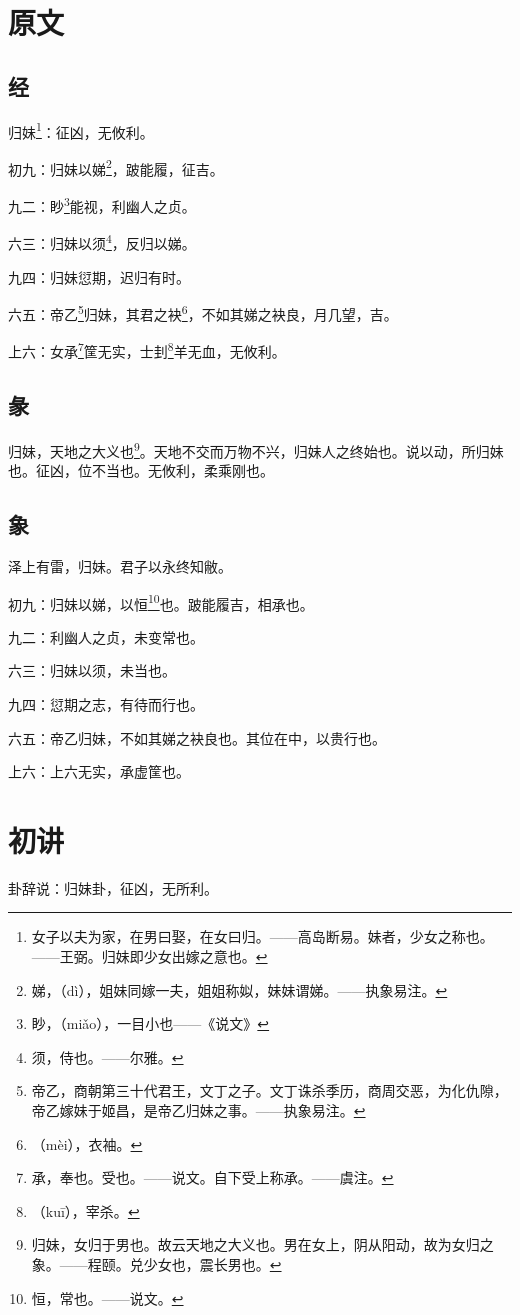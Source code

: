\documentclass[12pt,oneside]{book}
\begin{document}
\section{原文}

\subsection{经}
归妹\footnote{女子以夫为家，在男曰娶，在女曰归。——高岛断易。妹者，少女之称也。——王弼。归妹即少女出嫁之意也。}：征凶，无攸利。

初九：归妹以娣\footnote{娣，（dì），姐妹同嫁一夫，姐姐称姒，妹妹谓娣。——执象易注。}，跛能履，征吉。

九二：眇\footnote{眇，（miǎo），一目小也——《说文》}能视，利幽人之贞。

六三：归妹以须\footnote{须，侍也。——尔雅。}，反归以娣。

九四：归妹愆期，迟归有时。

六五：帝乙\footnote{帝乙，商朝第三十代君王，文丁之子。文丁诛杀季历，商周交恶，为化仇隙，帝乙嫁妹于姬昌，是帝乙归妹之事。——执象易注。}归妹，其君之袂\footnote{（mèi），衣袖。}，不如其娣之袂良，月几望，吉。

上六：女承\footnote{承，奉也。受也。——说文。自下受上称承。——虞注。}筐无实，士刲\footnote{（kuī），宰杀。}羊无血，无攸利。

\subsection{彖}
归妹，天地之大义也\footnote{归妹，女归于男也。故云天地之大义也。男在女上，阴从阳动，故为女归之象。——程颐。兑少女也，震长男也。}。天地不交而万物不兴，归妹人之终始也。说以动，所归妹也。征凶，位不当也。无攸利，柔乘刚也。

\subsection{象}
泽上有雷，归妹。君子以永终知敝。

初九：归妹以娣，以恒\footnote{恒，常也。——说文。}也。跛能履吉，相承也。

九二：利幽人之贞，未变常也。

六三：归妹以须，未当也。

九四：愆期之志，有待而行也。

六五：帝乙归妹，不如其娣之袂良也。其位在中，以贵行也。

上六：上六无实，承虚筐也。


\section{初讲}
卦辞说：归妹卦，征凶，无所利。
\end{document}
